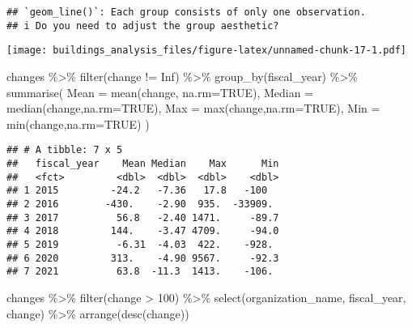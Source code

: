 \documentclass[
]{article}
\newenvironment{Shaded}{\begin{snugshade}}{\end{snugshade}}
\newcommand{\AttributeTok}[1]{\textcolor[rgb]{0.77,0.63,0.00}{#1}}
\newcommand{\ConstantTok}[1]{\textcolor[rgb]{0.00,0.00,0.00}{#1}}
\newcommand{\DecValTok}[1]{\textcolor[rgb]{0.00,0.00,0.81}{#1}}
\newcommand{\FunctionTok}[1]{\textcolor[rgb]{0.00,0.00,0.00}{#1}}
\newcommand{\NormalTok}[1]{#1}
\newcommand{\SpecialCharTok}[1]{\textcolor[rgb]{0.00,0.00,0.00}{#1}}
\begin{document}
\begin{verbatim}
## `geom_line()`: Each group consists of only one observation.
## i Do you need to adjust the group aesthetic?
\end{verbatim}

\texttt{[image: buildings\_analysis\_files/figure-latex/unnamed-chunk-17-1.pdf]}

\begin{Shaded}
\begin{Highlighting}[]
\NormalTok{changes }\SpecialCharTok{\%\textgreater{}\%} 
  \FunctionTok{filter}\NormalTok{(change }\SpecialCharTok{!=} \ConstantTok{Inf}\NormalTok{) }\SpecialCharTok{\%\textgreater{}\%} 
  \FunctionTok{group\_by}\NormalTok{(fiscal\_year) }\SpecialCharTok{\%\textgreater{}\%} 
  \FunctionTok{summarise}\NormalTok{(}
    \AttributeTok{Mean =} \FunctionTok{mean}\NormalTok{(change, }\AttributeTok{na.rm=}\ConstantTok{TRUE}\NormalTok{),}
    \AttributeTok{Median =} \FunctionTok{median}\NormalTok{(change,}\AttributeTok{na.rm=}\ConstantTok{TRUE}\NormalTok{),}
    \AttributeTok{Max =} \FunctionTok{max}\NormalTok{(change,}\AttributeTok{na.rm=}\ConstantTok{TRUE}\NormalTok{),}
    \AttributeTok{Min =} \FunctionTok{min}\NormalTok{(change,}\AttributeTok{na.rm=}\ConstantTok{TRUE}\NormalTok{)}
\NormalTok{  )}
\end{Highlighting}
\end{Shaded}

\begin{verbatim}
## # A tibble: 7 x 5
##   fiscal_year    Mean Median    Max      Min
##   <fct>         <dbl>  <dbl>  <dbl>    <dbl>
## 1 2015         -24.2   -7.36   17.8   -100  
## 2 2016        -430.    -2.90  935.  -33909. 
## 3 2017          56.8   -2.40 1471.     -89.7
## 4 2018         144.    -3.47 4709.     -94.0
## 5 2019          -6.31  -4.03  422.    -928. 
## 6 2020         313.    -4.90 9567.     -92.3
## 7 2021          63.8  -11.3  1413.    -106.
\end{verbatim}

\begin{Shaded}
\begin{Highlighting}[]
\NormalTok{changes }\SpecialCharTok{\%\textgreater{}\%} 
  \FunctionTok{filter}\NormalTok{(change }\SpecialCharTok{\textgreater{}} \DecValTok{100}\NormalTok{) }\SpecialCharTok{\%\textgreater{}\%} 
  \FunctionTok{select}\NormalTok{(organization\_name, fiscal\_year, change) }\SpecialCharTok{\%\textgreater{}\%} 
  \FunctionTok{arrange}\NormalTok{(}\FunctionTok{desc}\NormalTok{(change))}
\end{Highlighting}
\end{Shaded}
\end{document}
